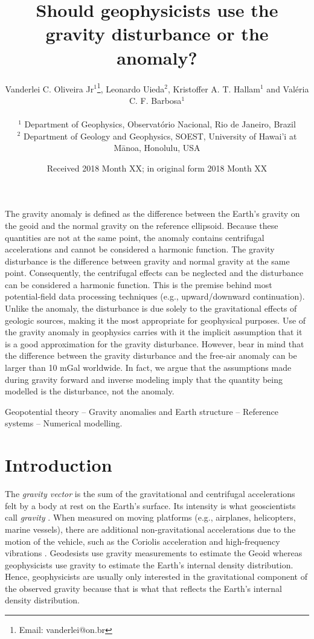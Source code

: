 \documentclass[extra]{gji}
\title[Gravity anomaly or gravity disturbance?]
      {Should geophysicists use the gravity disturbance or the anomaly?}
\author[Oliveira Jr et al.]{
\parbox{\linewidth}{%
    Vanderlei C. Oliveira Jr$^1$\thanks{Email: vanderlei@on.br},
    Leonardo Uieda$^2$, Kristoffer A. T. Hallam$^{1}$ and
    \linebreak Val\'{e}ria C. F. Barbosa$^1$
    \vspace{0.3cm} }%
    \\
    $^1$ Department of Geophysics, Observat\'{o}rio Nacional, Rio de Janeiro, Brazil \\
    $^2$ Department of Geology and Geophysics, SOEST, University of Hawai'i at M\={a}noa, Honolulu, USA
}
\date{Received 2018 Month XX; in original form 2018 Month XX}
\begin{document}
\label{firstpage}

\maketitle


\begin{summary}
 The gravity anomaly is defined as the difference between the Earth's gravity
 on the geoid and the normal gravity on the reference ellipsoid.
 Because these quantities are not at the same point, the anomaly contains
 centrifugal accelerations and cannot be considered a harmonic function.
 The gravity disturbance is the difference between gravity and normal gravity
 at the same point.
 Consequently, the centrifugal effects can be neglected and the disturbance can
 be considered a harmonic function.
 This is the premise behind most potential-field data processing techniques
 (e.g., upward/downward continuation).
 Unlike the anomaly, the disturbance is due solely to the
 gravitational effects of geologic sources, making it the most appropriate
 for geophysical purposes.
 Use of the gravity anomaly in geophysics carries with it the implicit
 assumption that it is a good approximation for the gravity disturbance.
 However, bear in mind that the difference between the gravity disturbance and
 the free-air anomaly can be larger than 10 mGal worldwide.
 In fact, we argue that the assumptions made during gravity forward and inverse
 modeling imply that the quantity being modelled is the disturbance, not the
 anomaly.
\end{summary}

\begin{keywords}
 Geopotential theory -- Gravity anomalies and Earth structure -- Reference systems -- Numerical modelling.
\end{keywords}


\section{Introduction}

The \textit{gravity vector} is the sum of the gravitational and centrifugal
accelerations felt by a body at rest on the Earth's surface.
Its intensity is what geoscientists call \textit{gravity}
\citep{heiskanen-moritz1967, hofmann-wellenhof-moritz2005}.
When measured on moving platforms (e.g., airplanes,
helicopters, marine vessels), there are additional
non-gravitational accelerations due to the motion of the vehicle,
such as the Coriolis acceleration and high-frequency vibrations
\citep{glennie-etal2000,nabighian-etal2005-grav,baumann-etal2012}.
Geodesists use gravity measurements to estimate the Geoid \citep{li2001}
whereas geophysicists use gravity to estimate the Earth's
internal density distribution.
Hence, geophysicists are usually only interested
in the gravitational component of the observed gravity
because that is what that reflects the Earth's internal density distribution.
\end{document}
